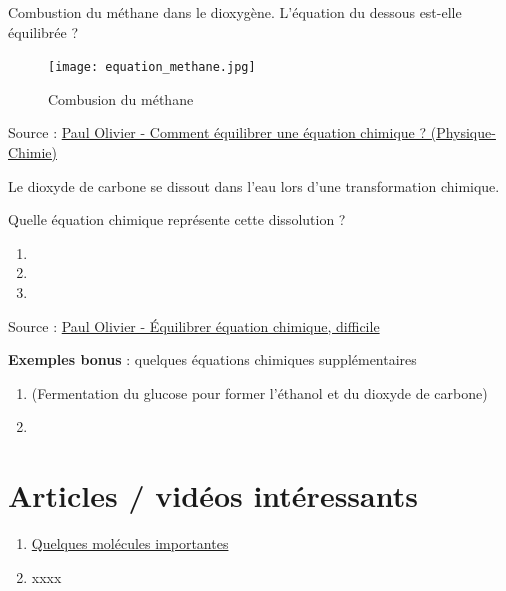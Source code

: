 \documentclass[a4paper,12pt]{article}
\begin{document}
\begin{tcolorbox}[colback=blue!10!white, colframe=blue!75!black, title=Exemples - Application]
  Combustion du méthane dans le dioxygène. L'équation du dessous est-elle équilibrée ?
  \begin{figure}[H]
    \centering
    \texttt{[image: equation\_methane.jpg]}
    \caption{\label{} Combusion du méthane}
  \end{figure}

  Source : \href{https://www.youtube.com/watch?v=VZVBS4OwwlE&ab_channel=PaulOlivier}{Paul Olivier - Comment équilibrer une équation chimique ? (Physique-Chimie)} \par
  \vspace{1em}
  
  Le dioxyde de carbone se dissout dans l'eau lors d'une transformation chimique. \par
  Quelle équation chimique représente cette dissolution ?

  \begin{enumerate}[noitemsep]
    \item {}
    \item {}
    \item {}
  \end{enumerate}

  Source : \href{https://www.youtube.com/watch?v=KRimPPjL9xg&ab_channel=PaulOlivier}{Paul Olivier - Équilibrer équation chimique, difficile } \par

  \textbf{Exemples bonus} : quelques équations chimiques supplémentaires

  \begin{enumerate}[noitemsep]
    \item {} (Fermentation du glucose pour former l'éthanol et du dioxyde de carbone)
    \item {}
  \end{enumerate}

\end{tcolorbox}

\section{Articles / vidéos intéressants}

\begin{enumerate}[noitemsep]
  \item \href{https://www.superprof.fr/ressources/physique-chimie/physique-chimie-tous-niveaux/formule-chimique-scientifique.html}{Quelques molécules importantes}
  \item xxxx
\end{enumerate}
\end{document}
